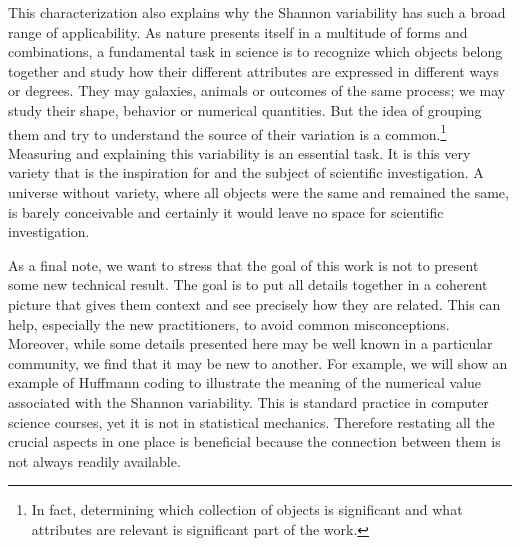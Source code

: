 \documentclass{article}
\begin{document}
This characterization also explains why the Shannon variability has such a broad range of applicability. As nature presents itself in a multitude of forms and combinations, a fundamental task in science is to recognize which objects belong together and study how their different attributes are expressed in different ways or degrees. They may galaxies, animals or outcomes of the same process; we may study their shape, behavior or numerical quantities. But the idea of grouping them and try to understand the source of their variation is a common.\footnote{In fact, determining which collection of objects is significant and what attributes are relevant is significant part of the work.} Measuring and explaining this variability is an essential task. It is this very variety that is the inspiration for and the subject of scientific investigation. A universe without variety, where all objects were the same and remained the same, is barely conceivable and certainly it would leave no space for scientific investigation.

As a final note, we want to stress that the goal of this work is not to present some new technical result. The goal is to put all details together in a coherent picture that gives them context and see precisely how they are related. This can help, especially the new practitioners, to avoid common misconceptions. Moreover, while some details presented here may be well known in a particular community, we find that it may be new to another. For example, we will show an example of Huffmann coding to illustrate the meaning of the numerical value associated with the Shannon variability. This is standard practice in computer science courses, yet it is not in statistical mechanics. Therefore restating all the crucial aspects in one place is beneficial because the connection between them is not always readily available.





\end{document}
